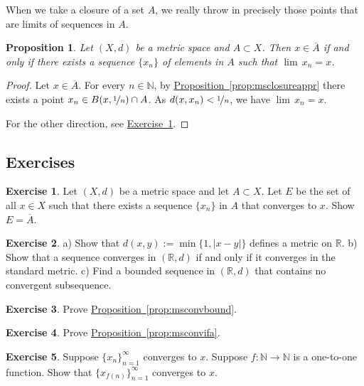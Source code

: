 \documentclass[12pt]{book}
\newcommand{\abs}[1]{\left\lvert {#1} \right\rvert}
\newcommand{\R}{{\mathbb{R}}}
\newcommand{\N}{{\mathbb{N}}}
\theoremstyle{plain}
\newtheorem{prop}[thm]{Proposition}
\theoremstyle{remark}
\theoremstyle{definition}
\theoremstyle{exercise}
\newtheorem{exercise}{Exercise}[section]
\theoremstyle{example}
\newcommand{\exerciseref}[1]{\hyperref[#1]{Exercise~\ref*{#1}}}
\newcommand{\propref}[1]{\hyperref[#1]{Proposition~\ref*{#1}}}
\begin{document}
When we take a closure of a set $A$, we really throw in precisely 
those points that are limits of sequences in $A$.

\begin{prop} \label{prop:msclosureapprseq}
Let $(X,d)$ be a metric space and $A \subset X$.
Then $x \in \overline{A}$ if and only if there exists a sequence $\{ x_n \}$ of
elements in $A$ such that $\lim\, x_n = x$.
\end{prop}

\begin{proof}
Let $x \in \overline{A}$.  For every $n \in \N$,
by
\propref{prop:msclosureappr} there
exists a point $x_n \in B(x,\nicefrac{1}{n}) \cap A$.
As $d(x,x_n) < \nicefrac{1}{n}$, we have $\lim\, x_n = x$.

For the other direction, see \exerciseref{exercise:reverseclosedseq}.
\end{proof}

\subsection{Exercises}

\begin{exercise} \label{exercise:reverseclosedseq}
Let $(X,d)$ be a metric space and
let $A \subset X$.  Let $E$ be the set of all $x \in X$ such that there
exists a sequence $\{ x_n \}$ in $A$ that converges to $x$.  Show 
$E = \overline{A}$.
\end{exercise}

\begin{exercise}
a) Show that $d(x,y) := \min \{ 1, \abs{x-y} \}$ defines a metric on $\R$.
b) Show that a sequence converges in $(\R,d)$ if and only if it converges
in the standard metric.  c) Find a bounded sequence in $(\R,d)$ that
contains no convergent subsequence.
\end{exercise}

\begin{exercise}
Prove \propref{prop:msconvbound}.
\end{exercise}

\begin{exercise}
Prove \propref{prop:msconvifa}.
\end{exercise}

\begin{exercise}
Suppose $\{x_n\}_{n=1}^\infty$ converges to $x$.  Suppose $f \colon \N
\to \N$ is a one-to-one function.  Show that
$\{ x_{f(n)} \}_{n=1}^\infty$ converges to $x$.
\end{exercise}
\end{document}
